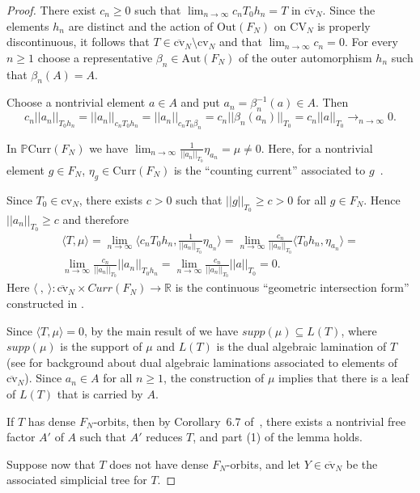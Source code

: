 \documentclass[10pt]{amsart}
\newcommand\<{\langle}
\renewcommand\>{\rangle}
\def\Pr{\mathbb P}
\newcommand{\Curr}{\mbox{Curr}}
\newcommand{\Out}{\mbox{Out}}
\newcommand{\Aut}{\mbox{Aut}}
\newcommand{\PCN}{\Pr\Curr(\FN)}
\newcommand{\FN}{F_N}   %
\newcommand{\cvn}{\mbox{cv}_N}
\newcommand{\cvnbar}{\overline{\mbox{cv}}_N}
\newcommand{\CVN}{\mbox{CV}_N}
\theoremstyle{definition}
\begin{document}
\begin{proof}
 

There exist $c_n\ge 0$ such that $\lim_{n\to\infty} c_n T_0h_n=T$ in $\cvnbar$. Since the elements $h_n$ are distinct and the action of $\Out(F_N)$ on $\CVN$ is properly discontinuous, it follows that $T\in \cvnbar\setminus\cvn$ and that $\lim_{n\to\infty}c_n=0$.
For every $n\ge 1$ choose a representative $\beta_n\in \Aut(F_N)$ of the outer automorphism $h_n$ such that $\beta_n(A)=A$.


Choose a nontrivial element $a\in A$ and put $a_n=\beta_n^{-1}(a)\in A$.
Then 
\[
c_n||a_n||_{T_0h_n} =||a_n||_{c_nT_0h_n}=||a_n||_{c_nT_0\beta_n}=c_n||\beta_n(a_n)||_{T_0}=c_n||a||_{T_0}\to_{n\to\infty} 0.
\]

In $\PCN$ we have $\lim_{n\to\infty}
\frac{1}{||a_n||_{T_0}}\eta_{a_n}=\mu\ne 0$.  
Here, for a nontrivial element $g\in F_N$, $\eta_g\in \Curr(F_N)$ is the
``counting current'' associated to $g$~\cite{Ka}.

Since $T_0\in\cvn$, there exists $c>0$ such that $||g||_{T_0}\ge c>0$ for all $g\in F_N$.
Hence $||a_n||_{T_0}\ge c$ and therefore
\begin{gather*}
\langle T,\mu\rangle=\lim_{n\to\infty} \langle c_nT_0h_n,
\frac{1}{||a_n||_{T_0}}\eta_{a_n}\rangle=
\lim_{n\to\infty} \frac{c_n}{||a_n||_{T_0}} \langle T_0h_n, \eta_{a_n}\rangle=\\
\lim_{n\to\infty} \frac{c_n}{||a_n||_{T_0}} ||a_n||_{T_0h_n}=\lim_{n\to\infty} \frac{c_n}{||a_n||_{T_0}}||a||_{T_0} = 0.
\end{gather*}
Here $\langle\ ,\ \rangle:\cvnbar\times Curr(F_N)\to \mathbb R$ is the
continuous ``geometric intersection form'' constructed in \cite{KL2}.


Since $\langle T,\mu\rangle=0$, by the main result of \cite{KL3} we have $supp(\mu)\subseteq
L(T)$, where $supp(\mu)$ is the support of $\mu$ and $L(T)$ is the
dual algebraic lamination of $T$ (see \cite{CHL2} for background about dual algebraic laminations associated to elements of $\cvnbar$). Since $a_n\in A$ for all $n\ge 1$, the construction of $\mu$ implies that there is a leaf of $L(T)$ that is carried by $A$.

If $T$ has dense $F_N$-orbits, then by Corollary~6.7 of~\cite{Rey},
there exists a nontrivial free factor $A'$ of $A$ such that $A'$
reduces $T$, and part (1) of the lemma holds.

Suppose now that $T$ does not have dense $F_N$-orbits, and let $Y\in\cvnbar$  be the associated simplicial tree for $T$.


\end{proof}
\end{document}

